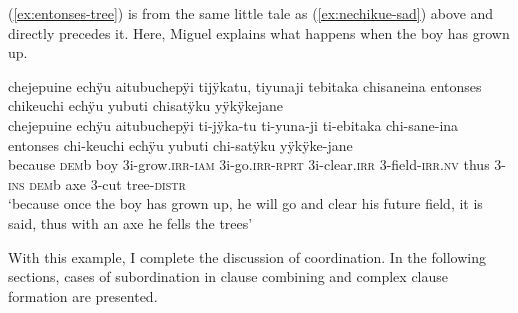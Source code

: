 (\ref{ex:entonses-tree}) is from the same little tale as (\ref{ex:nechikue-sad}) above and directly precedes it. Here, Miguel explains what happens when the boy has grown up.

\ea\label{ex:entonses-tree}
\begingl
\glpreamble chejepuine echÿu aitubuchepÿi tijÿkatu, tiyunaji tebitaka chisaneina entonses \\chikeuchi echÿu yubuti chisatÿku yÿkÿkejane\\
\gla chejepuine echÿu aitubuchepÿi ti-jÿka-tu ti-yuna-ji ti-ebitaka chi-sane-ina entonses chi-keuchi echÿu yubuti chi-satÿku yÿkÿke-jane\\
\glb because \textsc{dem}b boy 3i-grow.\textsc{irr}-\textsc{iam} 3i-go.\textsc{irr}-\textsc{rprt} 3i-clear.\textsc{irr} 3-field-\textsc{irr.nv} thus 3-\textsc{ins} \textsc{dem}b axe 3-cut tree-\textsc{distr}\\
\glft ‘because once the boy has grown up, he will go and clear his future field, it is said, thus with an axe he fells the trees’
\endgl
{}
\xe


With this example, I complete the discussion of coordination. In the following sections, cases of subordination in clause combining and complex clause formation are presented.

